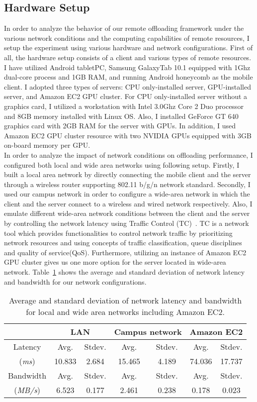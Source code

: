 \subsection{Hardware Setup}
\label{character:setup}
%
In order to analyze the behavior of our remote offloading framework
under the various network conditions and the computing capabilities of
remote resources, I setup the experiment using various hardware and
network configurations.
%
First of all, the hardware setup consists of a client and various types of
remote resources.
%
I have utilized Android tabletPC, Samsung GalaxyTab 10.1 equipped with
1Ghz dual-core process and 1GB RAM, and running Android honeycomb as the
mobile client.
%
I adopted three types of servers: CPU only-installed server,
GPU-installed server, and Amazon EC2 GPU cluster.
%
For CPU only-installed server without a graphics card, I utilized a
workstation with Intel 3.0Ghz Core 2 Duo processor and 8GB memory
installed with Linux OS.
%
Also, I installed GeForce GT 640 graphics card with 2GB RAM for the
server with GPUs.
%
In addition, I used Amazon EC2 GPU cluster resource with two NVIDIA
GPUs equipped with 3GB on-board memory per GPU.\\
%
In order to analyze the impact of network conditions on offloading
performance, I configured both local and wide area networks using
following setup.
%
Firstly, I built a local area network by directly connecting the mobile
client and the server through a wireless router supporting 802.11 b/g/n
network standard.
%
Secondly, I used our campus network in order to configure a wide-area
network in which the client and the server connect to a wireless and
wired network respectively.
%
Also, I emulate different wide-area network conditions between the
client and the server by controlling the network latency using Traffic
Control (TC)~\cite{tc}.
%
TC is a network tool which provides functionalities to control network
traffic by prioritizing network resources and using concepts of traffic
classification, queue disciplines and quality of service(QoS).
%
Furthermore, utilizing an instance of Amazon EC2 GPU cluster gives us
one more option for the server located in wide-area network.
%
Table~\ref{table:network_summary} shows the average and standard deviation of network latency and
bandwidth for our network configurations.
%
\begin{table}
\centering
\caption{Average and standard deviation of network latency and bandwidth
for local and wide area networks including Amazon EC2.}
	\begin{tabular}{c|cc|cc|cc}
	\hline
	\ & \multicolumn{2}{c|}{LAN} & \multicolumn{2}{c|}{Campus network} &
\multicolumn{2}{c}{Amazon EC2} \\
	\hline
	Latency & Avg. & Stdev. & Avg. & Stdev. & Avg. & Stdev.\\
	(\textit{ms}) & 10.833 & 2.684 & 15.465 & 4.189 & 74.036 & 17.737 \\ 
	Bandwidth & Avg. & Stdev. & Avg. & Stdev. & Avg. & Stdev. \\
    (\textit{MB/s}) & 6.523 & 0.177 & 2.461 & 0.238 & 0.178 & 0.023 \\ \hline
	\end{tabular}
\label{table:network_summary}
\end{table}
%
